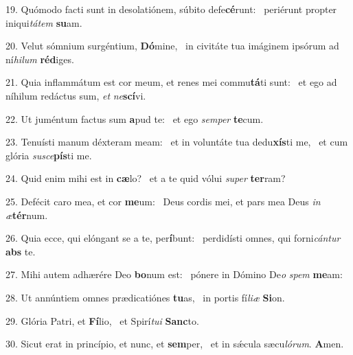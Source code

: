 19. Quómodo facti sunt in desolatiónem, súbito defe\textbf{cé}runt: \ast\  periérunt propter iniqui\textit{tá}\textit{tem} \textbf{su}am.\

20. Velut sómnium surgéntium, \textbf{Dó}mine, \ast\  in civitáte tua imáginem ipsórum ad ní\textit{hi}\textit{lum} \textbf{réd}iges.\

21. Quia inflammátum est cor meum, et renes mei commu\textbf{tá}ti sunt: \ast\  et ego ad níhilum redáctus sum, \textit{et} \textit{ne}\textbf{scí}vi.\

22. Ut juméntum factus sum \textbf{a}pud te: \ast\  et ego \textit{sem}\textit{per} \textbf{te}cum.\

23. Tenuísti manum déxteram meam: \dag\  et in voluntáte tua dedu\textbf{xís}ti me, \ast\  et cum glória \textit{su}\textit{sce}\textbf{pís}ti me.\

24. Quid enim mihi est in \textbf{cæ}lo? \ast\  et a te quid vólui \textit{su}\textit{per} \textbf{ter}ram?\

25. Defécit caro mea, et cor \textbf{me}um: \ast\  Deus cordis mei, et pars mea Deus \textit{in} \textit{æ}\textbf{tér}num.\

26. Quia ecce, qui elóngant se a te, per\textbf{í}bunt: \ast\  perdidísti omnes, qui forni\textit{cán}\textit{tur} \textbf{abs} te.\

27. Mihi autem adhærére Deo \textbf{bo}num est: \ast\  pónere in Dómino De\textit{o} \textit{spem} \textbf{me}am:\

28. Ut annúntiem omnes prædicatiónes \textbf{tu}as, \ast\  in portis fí\textit{li}\textit{æ} \textbf{Si}on.\

29. Glória Patri, et \textbf{Fí}lio, \ast\  et Spirí\textit{tu}\textit{i} \textbf{Sanc}to.\

30. Sicut erat in princípio, et nunc, et \textbf{sem}per, \ast\  et in sǽcula sæcu\textit{ló}\textit{rum}. \textbf{A}men.\

